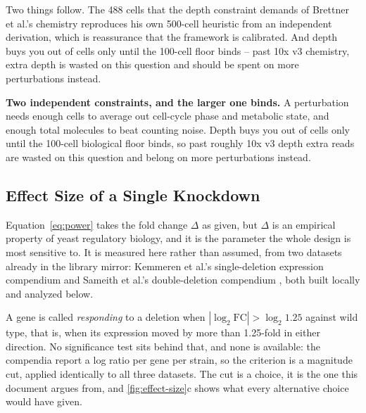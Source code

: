 

Two things follow. The 488 cells that the depth constraint demands of Brettner et al.'s
chemistry reproduces his own 500-cell heuristic from an independent derivation,
which is reassurance that the framework is calibrated. And depth buys you out of
cells only until the 100-cell floor binds -- past 10x v3 chemistry, extra depth
is wasted on this question and should be spent on more perturbations instead.

\begin{keybox}
\textbf{Two independent constraints, and the larger one binds.} A perturbation
needs enough cells to average out cell-cycle phase and metabolic state, and
enough total molecules to beat counting noise. Depth buys you out of cells only
until the 100-cell biological floor binds, so past roughly 10x v3 depth extra
reads are wasted on this question and belong on more perturbations instead.
\end{keybox}

\subsection{Effect Size of a Single Knockdown}
\label{sec:effect-size}

Equation~\ref{eq:power} takes the fold change $\Delta$ as given, but $\Delta$ is
an empirical property of yeast regulatory biology, and it is the parameter the
whole design is most sensitive to. It is measured here rather than assumed, from
two datasets already in the library mirror: Kemmeren et al.'s single-deletion
expression compendium \citep{kemmerenLargeScaleGeneticPerturbations2014} and
Sameith et al.'s double-deletion compendium
\citep{sameithHighresolutionGeneExpression2015}, both built locally and analyzed
below.

 A gene is
called \emph{responding} to a deletion when $|\log_2 \mathrm{FC}| > \log_2 1.25$
against wild type, that is, when its expression moved by more than 1.25-fold in
either direction. No significance test sits behind that, and none is available:
the compendia report a log ratio per gene per strain, so the criterion is a
magnitude cut, applied identically to all three datasets. The cut is a choice, it
is the one this document argues from, and \cref{fig:effect-size}c shows what
every alternative choice would have given.




